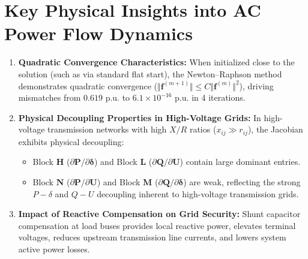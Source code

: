 \documentclass[12pt,a4paper,oneside]{report}
\begin{document}
\section{Key Physical Insights into AC Power Flow Dynamics}
\begin{enumerate}
    \item \textbf{Quadratic Convergence Characteristics:} When initialized close to the solution (such as via standard flat start), the Newton--Raphson method demonstrates quadratic convergence ($\Vert \mathbf{f}^{(m+1)} \Vert \le C \Vert \mathbf{f}^{(m)} \Vert^2$), driving mismatches from $0.619\text{ p.u.}$ to $6.1 \times 10^{-16}\text{ p.u.}$ in 4 iterations.
    \item \textbf{Physical Decoupling Properties in High-Voltage Grids:} In high-voltage transmission networks with high $X/R$ ratios ($x_{ij} \gg r_{ij}$), the Jacobian exhibits physical decoupling:
    \begin{itemize}
        \item Block $\mathbf{H}$ ($\partial \mathbf{P} / \partial \boldsymbol{\delta}$) and Block $\mathbf{L}$ ($\partial \mathbf{Q} / \partial \mathbf{U}$) contain large dominant entries.
        \item Block $\mathbf{N}$ ($\partial \mathbf{P} / \partial \mathbf{U}$) and Block $\mathbf{M}$ ($\partial \mathbf{Q} / \partial \boldsymbol{\delta}$) are weak, reflecting the strong $P-\delta$ and $Q-U$ decoupling inherent to high-voltage transmission grids.
    \end{itemize}
    \item \textbf{Impact of Reactive Compensation on Grid Security:} Shunt capacitor compensation at load buses provides local reactive power, elevates terminal voltages, reduces upstream transmission line currents, and lowers system active power losses.
\end{enumerate}
\end{document}
